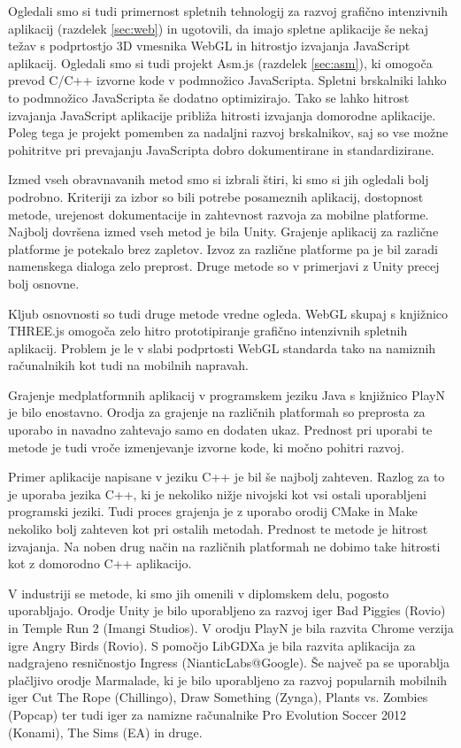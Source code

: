 Ogledali smo si tudi primernost spletnih tehnologij za razvoj grafično intenzivnih aplikacij (razdelek \ref{sec:web}) in ugotovili, da imajo spletne aplikacije še nekaj težav s podprtostjo 3D vmesnika WebGL in hitrostjo izvajanja JavaScript aplikacij. Ogledali smo si tudi projekt Asm.js (razdelek \ref{sec:asm}), ki omogoča prevod C/C++ izvorne kode v podmnožico JavaScripta. Spletni brskalniki lahko to podmnožico JavaScripta še dodatno optimizirajo. Tako se lahko hitrost izvajanja JavaScript aplikacije približa hitrosti izvajanja domorodne aplikacije. Poleg tega je projekt pomemben za nadaljni razvoj brskalnikov, saj so vse možne pohitritve pri prevajanju JavaScripta dobro dokumentirane in standardizirane.

Izmed vseh obravnavanih metod smo si izbrali štiri, ki smo si jih ogledali bolj podrobno. Kriteriji za izbor so bili potrebe posameznih aplikacij, dostopnost metode, urejenost dokumentacije in zahtevnost razvoja za mobilne platforme. Najbolj dovršena izmed vseh metod je bila Unity. Grajenje aplikacij za različne platforme je potekalo brez zapletov. Izvoz za različne platforme pa je bil zaradi namenskega dialoga zelo preprost. Druge metode so v primerjavi z Unity precej bolj osnovne.

Kljub osnovnosti so tudi druge metode vredne ogleda. WebGL skupaj s knjižnico THREE.js omogoča zelo hitro prototipiranje grafično intenzivnih spletnih aplikacij. Problem je le v slabi podprtosti WebGL standarda tako na namiznih računalnikih kot tudi na mobilnih napravah.

Grajenje medplatformnih aplikacij v programskem jeziku Java s knjižnico PlayN je bilo enostavno. Orodja za grajenje na različnih platformah so preprosta za uporabo in navadno zahtevajo samo en dodaten ukaz. Prednost pri uporabi te metode je tudi vroče izmenjevanje izvorne kode, ki močno pohitri razvoj. 

Primer aplikacije napisane v jeziku C++ je bil še najbolj zahteven. Razlog za to je uporaba jezika C++, ki je nekoliko nižje nivojski kot vsi ostali uporabljeni programski jeziki. Tudi proces grajenja je z uporabo orodij CMake in Make nekoliko bolj zahteven kot pri ostalih metodah. Prednost te metode je hitrost izvajanja. Na noben drug način na različnih platformah ne dobimo take hitrosti kot z domorodno C++ aplikacijo.

V industriji se metode, ki smo jih omenili v diplomskem delu, pogosto uporabljajo. Orodje Unity je bilo uporabljeno za razvoj iger Bad Piggies (Rovio) in Temple Run 2 (Imangi Studios). V orodju PlayN je bila razvita Chrome verzija igre Angry Birds (Rovio). S pomočjo LibGDXa je bila razvita aplikacija za nadgrajeno resničnostjo Ingress (NianticLabs@Google). Še največ pa se uporablja plačljivo orodje Marmalade, ki je bilo uporabljeno za razvoj popularnih mobilnih iger Cut The Rope (Chillingo), Draw Something (Zynga), Plants vs. Zombies (Popcap) ter tudi iger za namizne računalnike Pro Evolution Soccer 2012 (Konami), The Sims (EA) in druge.

